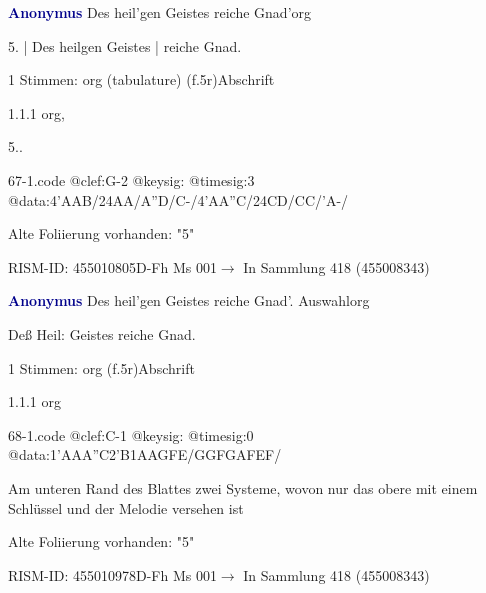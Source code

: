 \documentclass[twocolumn, 12pt]{book}
\begin{document}
\par \vspace{16pt} \textcolor{darkblue}{\textbf{Anonymus  }}\hfillplus{\textbf{[67]}}\newline Des heil'gen Geistes reiche Gnad'\newline org
\par \begin{itshape}[f.5r, at left:] 5. | Des heilgen Geistes | reiche Gnad.\end{itshape} 
\par \textcolor{darkblue}{}  1 Stimmen: org (tabulature)  (f.5r)\newline Abschrift
\par 1.1.1  org, \begin{itshape}5..\end{itshape}  
\begin{filecontents*}{67-1.code}
@clef:G-2
@keysig:
@timesig:3
@data:4'AAB/24AA/A''D/C-/4'AA''C/24CD/CC/'A-/
\end{filecontents*}
\newline %
\par Alte Foliierung vorhanden: "5"
\par RISM-ID: 455010805\newline D-Fh  Ms 001\newline $\rightarrow$ In Sammlung 418 (455008343)
      
\par \vspace{16pt} \textcolor{darkblue}{\textbf{Anonymus  }}\hfillplus{\textbf{[68]}}\newline Des heil'gen Geistes reiche Gnad'. Auswahl\newline org
\par \begin{itshape} Deß Heil: Geistes reiche Gnad.\end{itshape} 
\par \textcolor{darkblue}{}  1 Stimmen: org  (f.5r)\newline Abschrift
\par 1.1.1  org  
\begin{filecontents*}{68-1.code}
@clef:C-1
@keysig:
@timesig:0
@data:1'AAA''C2'B1AAGFE/GGFGAFEF/
\end{filecontents*}
\newline %
\par Am unteren Rand des Blattes zwei Systeme, wovon nur das obere mit einem Schlüssel und der Melodie versehen ist
\par Alte Foliierung vorhanden: "5"
\par RISM-ID: 455010978\newline D-Fh  Ms 001\newline $\rightarrow$ In Sammlung 418 (455008343)
      
\end{document}
